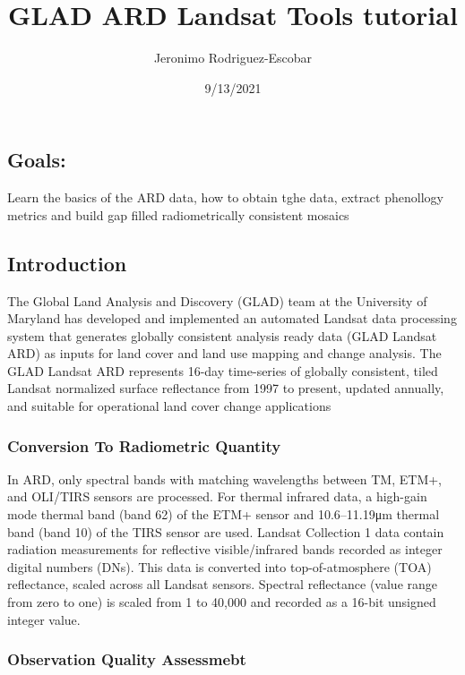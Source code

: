 \documentclass[]{article}
\title{GLAD ARD Landsat Tools tutorial}
\author{Jeronimo Rodriguez-Escobar}
\date{9/13/2021}
\begin{document}
\maketitle

\hypertarget{goals}{%
\subsection{Goals:}\label{goals}}

Learn the basics of the ARD data, how to obtain tghe data, extract
phenollogy metrics and build gap filled radiometrically consistent
mosaics

\hypertarget{introduction}{%
\subsection{Introduction}\label{introduction}}

The Global Land Analysis and Discovery (GLAD) team at the University of
Maryland has developed and implemented an automated Landsat data
processing system that generates globally consistent analysis ready data
(GLAD Landsat ARD) as inputs for land cover and land use mapping and
change analysis. The GLAD Landsat ARD represents 16-day time-series of
globally consistent, tiled Landsat normalized surface reflectance from
1997 to present, updated annually, and suitable for operational land
cover change applications

\hypertarget{conversion-to-radiometric-quantity}{%
\subsubsection{Conversion To Radiometric
Quantity}\label{conversion-to-radiometric-quantity}}

In ARD, only spectral bands with matching wavelengths between TM, ETM+,
and OLI/TIRS sensors are processed. For thermal infrared data, a
high-gain mode thermal band (band 62) of the ETM+ sensor and
10.6--11.19μm thermal band (band 10) of the TIRS sensor are used.
Landsat Collection 1 data contain radiation measurements for reflective
visible/infrared bands recorded as integer digital numbers (DNs). This
data is converted into top-of-atmosphere (TOA) reflectance, scaled
across all Landsat sensors. Spectral reflectance (value range from zero
to one) is scaled from 1 to 40,000 and recorded as a 16-bit unsigned
integer value.

\hypertarget{observation-quality-assessmebt}{%
\subsubsection{Observation Quality
Assessmebt}\label{observation-quality-assessmebt}}
\end{document}
